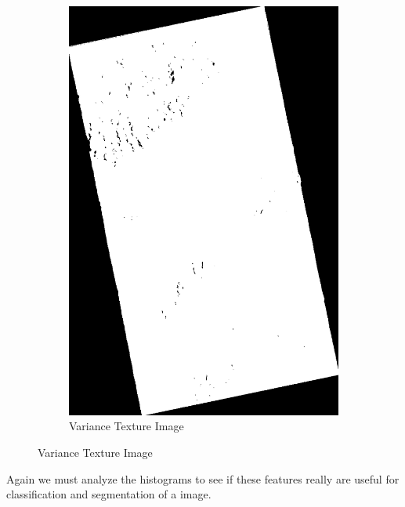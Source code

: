 \begin{figure}[H]\ContinuedFloat
  \centering
  \begin{subfigure}[b]{0.4\linewidth}
    \includegraphics[width=\linewidth]{Chapter4/sum_and_diff_textures/varianceimage.png}
     \caption{Variance Texture Image}
  \end{subfigure}
\end{figure}
Again we must analyze the histograms to see if these features really are useful for classification and segmentation of a image.


